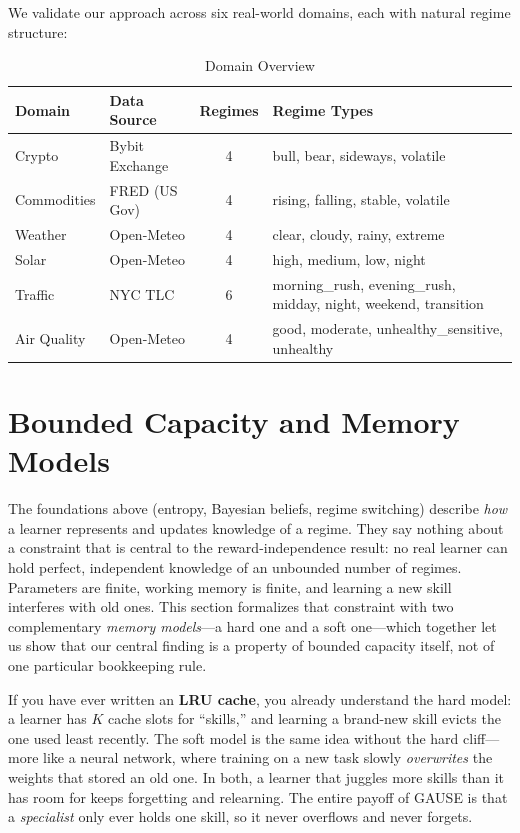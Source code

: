 \documentclass[11pt,a4paper]{article}
\theoremstyle{definition}
\theoremstyle{plain}
\begin{document}
We validate our approach across six real-world domains, each with natural regime structure:

\begin{table}[h]
\centering
\caption{Domain Overview}
\begin{tabular}{llcl}
\toprule
Domain & Data Source & Regimes & Regime Types \\
\midrule
Crypto & Bybit Exchange & 4 & bull, bear, sideways, volatile \\
Commodities & FRED (US Gov) & 4 & rising, falling, stable, volatile \\
Weather & Open-Meteo & 4 & clear, cloudy, rainy, extreme \\
Solar & Open-Meteo & 4 & high, medium, low, night \\
Traffic & NYC TLC & 6 & morning\_rush, evening\_rush, midday, night, weekend, transition \\
Air Quality & Open-Meteo & 4 & good, moderate, unhealthy\_sensitive, unhealthy \\
\bottomrule
\end{tabular}
\end{table}

\section{Bounded Capacity and Memory Models}
\label{sec:memory_models}

The foundations above (entropy, Bayesian beliefs, regime switching) describe
\emph{how} a learner represents and updates knowledge of a regime. They say
nothing about a constraint that is central to the reward-independence result:
no real learner can hold perfect, independent knowledge of an unbounded number
of regimes. Parameters are finite, working memory is finite, and learning a new
skill interferes with old ones. This section formalizes that constraint with two
complementary \emph{memory models}---a hard one and a soft one---which together
let us show that our central finding is a property of bounded capacity itself,
not of one particular bookkeeping rule.

\begin{intuition}[title={The one-sentence version}]
If you have ever written an \textbf{LRU cache}, you already understand the hard
model: a learner has $K$ cache slots for ``skills,'' and learning a brand-new
skill evicts the one used least recently. The soft model is the same idea without
the hard cliff---more like a neural network, where training on a new task slowly
\emph{overwrites} the weights that stored an old one. In both, a learner that
juggles more skills than it has room for keeps forgetting and relearning. The
entire payoff of GAUSE is that a \emph{specialist} only ever holds one skill, so
it never overflows and never forgets.
\end{intuition}
\end{document}
